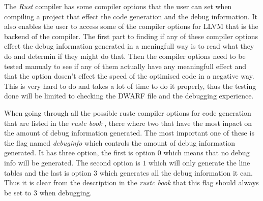 

The \emph{Rust} compiler has some compiler options that the user can set when compiling a project that effect the code generation and the debug information.
It also enables the user to access some of the compiler options for \gls{LLVM} that is the backend of the compiler.
The first part to finding if any of these compiler options effect the debug information generated in a meningfull way is to read what they do and determin if they might do that.
Then the compiler options need to be tested manualy to see if any of them actually have any meaningfull effect and that the option dosen't effect the speed of the optimised code in a negative way.
This is very hard to do and takes a lot of time to do it properly, thus the testing done will be limited to checking the \gls{DWARF} file and the debugging experience.


When going through all the possible \gls{rustc} compiler options for code generation that are listed in the \emph{rustc book} \cite{rustc-book-codegen}, there where two that have the most inpact on the amount of debug information generated.
The most important one of these is the flag named \emph{debuginfo} which controls the amount of debug information generated.
It has three option, the first is option $0$ which means that no debug info will be generated.
The second option is $1$ which will only generate the line tables and the last is option $3$ which generates all the debug information it can.
Thus it is clear from the description in the \emph{rustc book} that this flag should always be set to $3$ when debugging.


